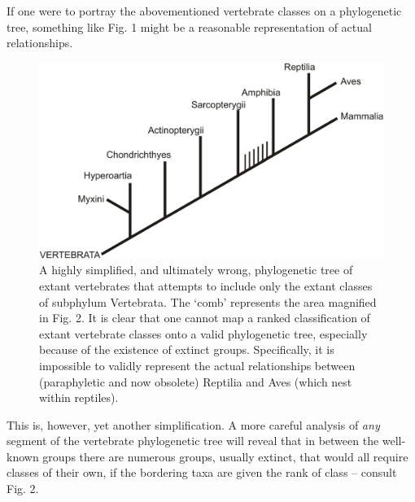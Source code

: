 \begin{artengenv}
If one were to portray the abovementioned vertebrate classes on a phylogenetic tree, something like Fig. 1 might be a
reasonable representation of actual relationships.

\begin{figure}[h]
	\centering
	\includegraphics[width=1\textwidth]{PAU_Lamza/Lamzaorg-img001.pdf}
	\caption{A highly simplified, and ultimately wrong, phylogenetic tree of extant vertebrates that attempts to
		include only the extant classes of subphylum Vertebrata. The ‘comb’ represents the area magnified in Fig. 2. It is
		clear that one cannot map a ranked classification of extant vertebrate classes onto a valid phylogenetic tree,
		especially because of the existence of extinct groups. Specifically, it is impossible to validly represent the actual
		relationships between (paraphyletic and now obsolete) Reptilia and Aves (which nest within reptiles).}
	\label{lamza-fig1}
\end{figure}

This is, however, yet another simplification. A more careful analysis of \textit{any }segment of the vertebrate
phylogenetic tree will reveal that in between the well-known groups there are numerous groups, usually extinct, that
would all require classes of their own, if the bordering taxa are given the rank of class – consult Fig. 2.


\end{artengenv}
